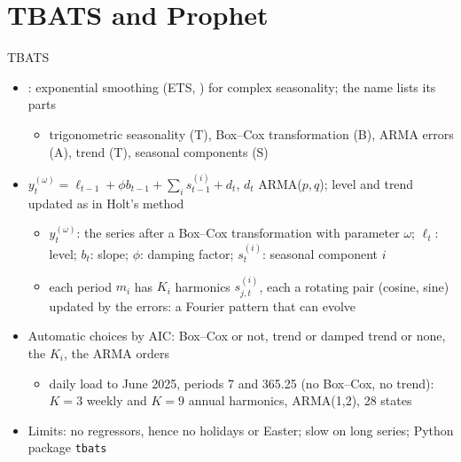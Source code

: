 \section{TBATS and Prophet}

\begin{frame}{TBATS}
\itemsize{\footnotesize}
\begin{itemize}
    \item {}: exponential smoothing (ETS, ) for complex seasonality; the name lists its parts
    \begin{itemize}
        \item trigonometric seasonality (T), Box--Cox transformation (B), ARMA errors (A), trend (T), seasonal components (S)
    \end{itemize}
    \item $y_t^{(\omega)} = \ell_{t-1} + \phi b_{t-1} + \sum_{i}s^{(i)}_{t-1} + d_t$, $d_t$ ARMA($p,q$); level and trend updated as in Holt's method
    \begin{itemize}
        \item $y_t^{(\omega)}$: the series after a Box--Cox transformation with parameter $\omega$; $\ell_t$: level; $b_t$: slope; $\phi$: damping factor; $s^{(i)}_t$: seasonal component $i$
        \item each period $m_i$ has $K_i$ harmonics $s^{(i)}_{j,t}$, each a rotating pair (cosine, sine) updated by the errors: a Fourier pattern that can evolve
    \end{itemize}
    \item Automatic choices by AIC: Box--Cox or not, trend or damped trend or none, the $K_i$, the ARMA orders
    \begin{itemize}
        \item daily load to June 2025, periods 7 and 365.25 (no Box--Cox, no trend): $K = 3$ weekly and $K = 9$ annual harmonics, ARMA(1,2), 28 states
    \end{itemize}
    \item Limits: no regressors, hence no holidays or Easter; slow on long series; Python package \texttt{tbats}
\end{itemize}
\end{frame}

